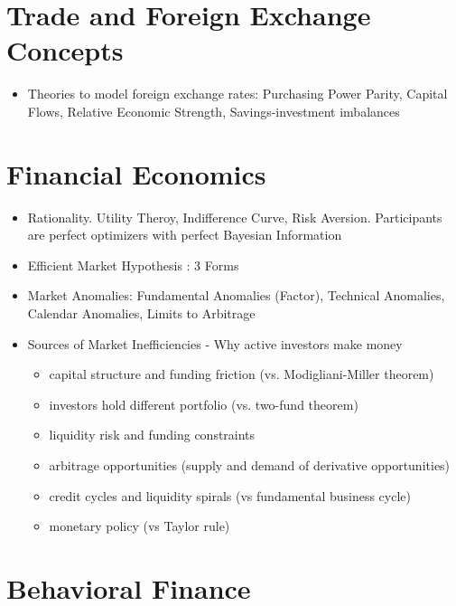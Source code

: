 \documentclass[11pt, openany]{book}              %
\begin{document}
\section{Trade and Foreign Exchange Concepts}

\begin{itemize}
	\item Theories to model foreign exchange rates: Purchasing Power Parity, Capital Flows, Relative Economic Strength, Savings-investment imbalances
\end{itemize}


\section{Financial Economics}
\begin{itemize}
    \item Rationality. Utility Theroy, Indifference Curve, Risk Aversion. Participants are perfect optimizers with perfect Bayesian Information
    \item Efficient Market Hypothesis : 3 Forms
    \item Market Anomalies: Fundamental Anomalies (Factor), Technical Anomalies, Calendar Anomalies, Limits to Arbitrage 
    \item Sources of Market Inefficiencies - Why active investors make money
    	\begin{itemize}
			\item capital structure and funding friction (vs. Modigliani-Miller theorem)
			\item investors hold different portfolio (vs. two-fund theorem)
			\item liquidity risk and funding constraints
			\item arbitrage opportunities (supply and demand of derivative opportunities)
			\item credit cycles and liquidity spirals (vs fundamental business cycle)
			\item monetary policy (vs Taylor rule)
    	\end{itemize}
\end{itemize}

\section{Behavioral Finance}
\end{document}

